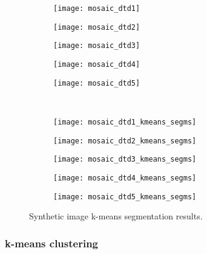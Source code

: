 \begin{figure}[!ht]
    \centering
    \begin{subfigure}[b]{0.19\textwidth}
        \texttt{[image: mosaic\_dtd1]}
    \end{subfigure} 
    \begin{subfigure}[b]{0.19\textwidth}
    	\texttt{[image: mosaic\_dtd2]}
    \end{subfigure}     
    \begin{subfigure}[b]{0.19\textwidth}
        \texttt{[image: mosaic\_dtd3]}
    \end{subfigure}
    \begin{subfigure}[b]{0.19\textwidth}
    	\texttt{[image: mosaic\_dtd4]}
    \end{subfigure}    
    \begin{subfigure}[b]{0.19\textwidth}
        \texttt{[image: mosaic\_dtd5]}
    \end{subfigure} \\ [2ex]
    
    \begin{subfigure}[b]{0.19\textwidth}
    	\texttt{[image: mosaic\_dtd1\_kmeans\_segms]}
        \caption{}
    \end{subfigure}     
    \begin{subfigure}[b]{0.19\textwidth}
        \texttt{[image: mosaic\_dtd2\_kmeans\_segms]}
        \caption{}
    \end{subfigure} 
    \begin{subfigure}[b]{0.19\textwidth}
    	\texttt{[image: mosaic\_dtd3\_kmeans\_segms]}
        \caption{}
    \end{subfigure}     
    \begin{subfigure}[b]{0.19\textwidth}
        \texttt{[image: mosaic\_dtd4\_kmeans\_segms]}
        \caption{}
    \end{subfigure}
    \begin{subfigure}[b]{0.19\textwidth}
    	\texttt{[image: mosaic\_dtd5\_kmeans\_segms]}
        \caption{}
    \end{subfigure} 
        	    
    \caption{Synthetic image k-means segmentation results.}\label{fig:kmeans_segms_dtd_mosaics}    
\end{figure}


\subsubsection{k-means clustering}
